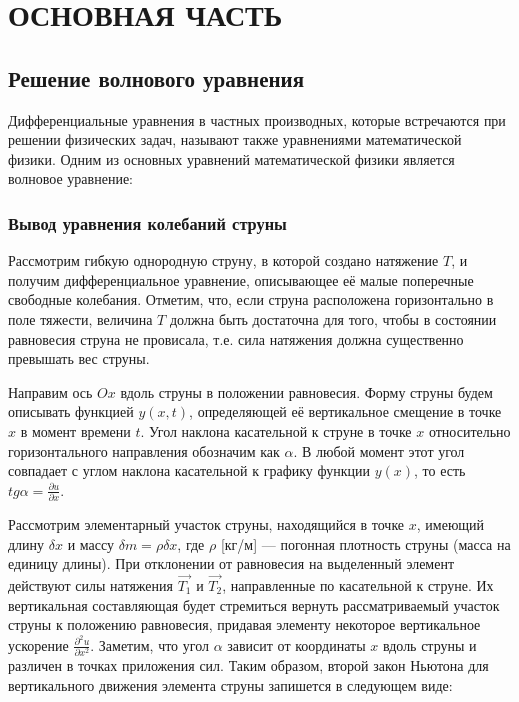 \documentclass[12pt,a4paper,russian]{report}
\renewcommand*{\contentsname}{СОДЕРЖАНИЕ}
\begin{document}
	
	\renewcommand{\contentsname}{СОДЕРЖАНИЕ} 
	\tableofcontents
	
	
	
	\newpage
	\chapter*{ОСНОВНАЯ ЧАСТЬ}
	
	
	
	\section{Решение волнового уравнения}
	Дифференциальные уравнения в частных производных, которые встречаются при решении физических задач, называют также уравнениями математической физики. Одним из основных уравнений математической физики является волновое уравнение:
	
	
	\subsection{Вывод уравнения колебаний струны}
	
	
	Рассмотрим гибкую однородную струну, в которой создано натяжение $T$, и получим дифференциальное уравнение, описывающее её малые поперечные свободные колебания. Отметим, что, если струна расположена горизонтально в поле тяжести, величина $T$ должна быть достаточна для того, чтобы в состоянии равновесия струна не провисала, т.е. сила натяжения должна существенно превышать вес струны. 
	
	Направим ось $Ox$ вдоль струны в положении равновесия. Форму струны будем описывать функцией $y(x, t)$, определяющей её вертикальное смещение в точке $x$ в момент времени $t$. Угол наклона касательной к струне в точке $x$ относительно горизонтального направления обозначим как $\alpha$. В любой момент этот угол совпадает с углом наклона касательной к графику функции $y(x)$, то есть $tg \alpha = \frac{\partial u}{\partial x}$. 
	
	
	Рассмотрим элементарный участок струны, находящийся в точке $x$, имеющий длину $\delta x$ и массу $\delta m = \rho \delta x$, где $\rho$ [кг/м] — погонная плотность струны (масса на единицу длины). При отклонении от равновесия на выделенный элемент действуют силы натяжения $\overrightarrow{T_1}$ и $\overrightarrow{T_2}$, направленные по касательной к струне. Их вертикальная составляющая будет стремиться вернуть рассматриваемый участок струны к положению равновесия, придавая элементу некоторое вертикальное ускорение $\frac{\partial^2 u}{\partial x^2}$. Заметим, что угол $\alpha$ зависит от координаты $x$ вдоль струны и различен в точках приложения сил. Таким образом, второй закон Ньютона для вертикального движения элемента струны запишется в следующем виде:
	
\end{document}
